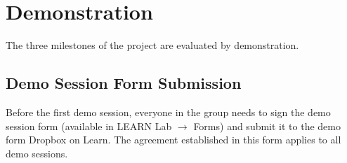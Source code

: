 \section{Demonstration}
The three milestones of the project are evaluated by demonstration.

\subsection{Demo Session Form Submission}
Before the first demo session, everyone in the group needs to sign the demo session form (available in LEARN Lab $\rightarrow$ Forms) and submit it to the demo form Dropbox on Learn. The agreement established in this form applies to all demo sessions. 

